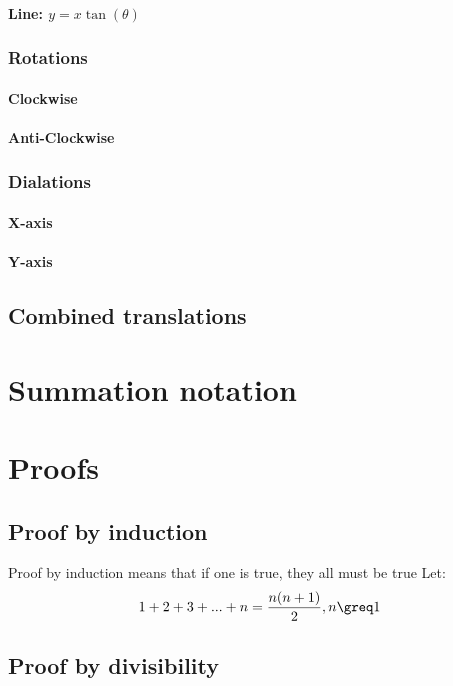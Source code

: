 \documentclass{book}
\newenvironment{generalInformation}{}{}
\newenvironment{example}{}{}
\begin{document}
\subsubsection{Line: $y = x \tan(\theta)$}

\subsection{Rotations}
\subsubsection{Clockwise}

\subsubsection{Anti-Clockwise}

\subsection{Dialations}
\subsubsection{X-axis}

\subsubsection{Y-axis}

\section{Combined translations}



\chapter{Summation notation}



\chapter{Proofs}
\section{Proof by induction}
\begin{generalInformation}
    Proof by induction means that if one is true, they all must be true 
\end{generalInformation}
\begin{example}
    Let:
    \[
        1 + 2 + 3 + ... + n = \frac{n(n + 1)}{2}, n \greq 1
    \]
    
\end{example}

\section{Proof by divisibility}
\end{document}
